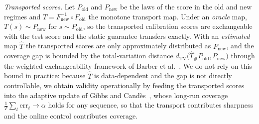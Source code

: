 \documentclass[preprint,3p,times]{elsarticle}
\begin{document}
\emph{Transported scores.} Let $P_{\mathrm{old}}$ and $P_{\mathrm{new}}$ be the laws of the score in the old and new regimes and $T=F_{\mathrm{new}}^{-1}\circ F_{\mathrm{old}}$ the monotone transport map. Under an \emph{oracle} map, $T(s)\sim P_{\mathrm{new}}$ for $s\sim P_{\mathrm{old}}$, so the transported calibration scores are exchangeable with the test score and the static guarantee transfers exactly. With an \emph{estimated} map $\hat T$ the transported scores are only approximately distributed as $P_{\mathrm{new}}$, and the coverage gap is bounded by the total-variation distance $d_{\mathrm{TV}}\big(\hat T_\# P_{\mathrm{old}},P_{\mathrm{new}}\big)$ through the weighted-exchangeability framework of Barber et al.~\cite{barber2023}. We do not rely on this bound in practice: because $\hat T$ is data-dependent and the gap is not directly controllable, we obtain validity operationally by feeding the transported scores into the adaptive update of Gibbs and Cand\`es~\cite{gibbs2021}, whose long-run coverage $\frac1T\sum_t\mathrm{err}_t\to\alpha$ holds for any sequence, so that the transport contributes sharpness and the online control contributes coverage.
\end{document}
